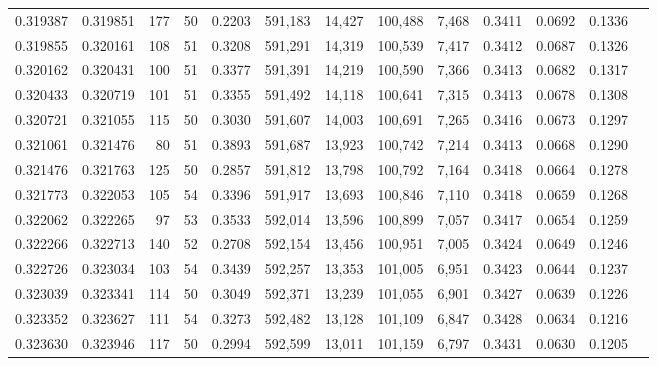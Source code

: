 \begin{tabular}{rrrrrrrrrrrrr}
0.319387 & 0.319851 &   177 &  50 &                                     0.2203 & 591,183 &  14,427 & 100,488 &   7,468 & 0.3411 & 0.0692 & 0.1336 \\
0.319855 & 0.320161 &   108 &  51 &                                     0.3208 & 591,291 &  14,319 & 100,539 &   7,417 & 0.3412 & 0.0687 & 0.1326 \\
0.320162 & 0.320431 &   100 &  51 &                                     0.3377 & 591,391 &  14,219 & 100,590 &   7,366 & 0.3413 & 0.0682 & 0.1317 \\
0.320433 & 0.320719 &   101 &  51 &                                     0.3355 & 591,492 &  14,118 & 100,641 &   7,315 & 0.3413 & 0.0678 & 0.1308 \\
0.320721 & 0.321055 &   115 &  50 &                                     0.3030 & 591,607 &  14,003 & 100,691 &   7,265 & 0.3416 & 0.0673 & 0.1297 \\
0.321061 & 0.321476 &    80 &  51 &                                     0.3893 & 591,687 &  13,923 & 100,742 &   7,214 & 0.3413 & 0.0668 & 0.1290 \\
0.321476 & 0.321763 &   125 &  50 &                                     0.2857 & 591,812 &  13,798 & 100,792 &   7,164 & 0.3418 & 0.0664 & 0.1278 \\
0.321773 & 0.322053 &   105 &  54 &                                     0.3396 & 591,917 &  13,693 & 100,846 &   7,110 & 0.3418 & 0.0659 & 0.1268 \\
0.322062 & 0.322265 &    97 &  53 &                                     0.3533 & 592,014 &  13,596 & 100,899 &   7,057 & 0.3417 & 0.0654 & 0.1259 \\
0.322266 & 0.322713 &   140 &  52 &                                     0.2708 & 592,154 &  13,456 & 100,951 &   7,005 & 0.3424 & 0.0649 & 0.1246 \\
0.322726 & 0.323034 &   103 &  54 &                                     0.3439 & 592,257 &  13,353 & 101,005 &   6,951 & 0.3423 & 0.0644 & 0.1237 \\
0.323039 & 0.323341 &   114 &  50 &                                     0.3049 & 592,371 &  13,239 & 101,055 &   6,901 & 0.3427 & 0.0639 & 0.1226 \\
0.323352 & 0.323627 &   111 &  54 &                                     0.3273 & 592,482 &  13,128 & 101,109 &   6,847 & 0.3428 & 0.0634 & 0.1216 \\
0.323630 & 0.323946 &   117 &  50 &                                     0.2994 & 592,599 &  13,011 & 101,159 &   6,797 & 0.3431 & 0.0630 & 0.1205 \\

\end{tabular}
